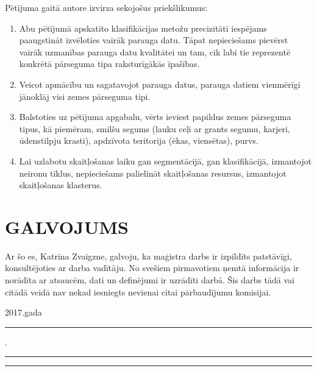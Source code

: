 \documentclass[12pt,paper=a4]{report}
\begin{document}
Pētījuma gaitā autore izvirza sekojošus priekšlikumus:
\begin{enumerate}
\item Abu pētījumā apskatīto klasifikācijas metožu precizitāti iespējams paaugstināt izvēloties vairāk parauga datu. Tāpat nepieciešams pievērst vairāk uzmanības parauga datu kvalitātei un tam, cik labi tie reprezentē konkrētā pārseguma tipa raksturīgākās īpašības. 
\item Veicot apmācību un sagatavojot parauga datus, parauga datiem vienmērīgi jānoklāj visi zemes pārseguma tipi.
\item Balstoties uz pētījuma apgabalu, vērts ieviest papildus zemes pārseguma tipus, kā piemēram, smilšu segums (lauku ceļi ar grants segumu, karjeri, ūdenstilpju krasti), apdzīvota teritorija (ēkas, viensētas), purvs.
\item Lai uzlabotu skaitļošanas laiku gan segmentācijā, gan klasifikācijā, izmantojot neironu tīklus, nepieciešams palielināt skaitļošanas resursus, izmantojot skaitļošanas klasterus. 
\end{enumerate}
{}


\chapter*{GALVOJUMS}
\vspace{60pt}
Ar šo es, Katrīna Zvaigzne, galvoju, ka maģistra darbs ir izpildīts patstāvīgi, konsultējoties ar darba vadītāju. No svešiem pirmavotiem ņemtā informācija ir norādīta ar atsaucēm, dati un definējumi ir uzrādīti darbā. Šis darbs tādā vai citādā veidā nav nekad iesniegts nevienai citai pārbaudījumu komisijai. 

\vspace{60pt}
\vspace{1in}

2017.gada \rule{1cm}{0.2pt}.\rule{3cm}{0.2pt} \hspace{3cm}\rule{5cm}{0.2pt}

\label{LastPage}
\end{document}
